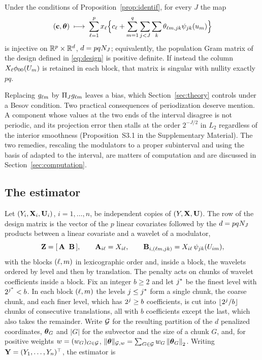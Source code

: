 \begin{lemma}
\label{lem:basis}
Under the conditions of Proposition~\ref{prop:identif}, for every $J$ the map
\[
  (\mathbf{c}, \boldsymbol{\theta}) \;\longmapsto\;
  \sum_{\ell=1}^{p} x_{\ell}\Bigl\{c_{\ell} + \sum_{m=1}^{q}
  \sum_{j<J}\sum_{k} \theta_{\ell m,jk}
  \psi_{jk}(u_{m})\Bigr\}
\]
is injective on $\mathbb{R}^{p}\times\mathbb{R}^{d}$, $d = pqN_{J}$; equivalently, the
population Gram matrix of the design defined in \eqref{eq:design} is positive
definite. If instead the column $X_{\ell}\phi_{00}(U_{m})$ is retained in
each block, that matrix is singular with nullity exactly $pq$.
\end{lemma}

Replacing $g_{\ell m}$ by $\Pi_{J}g_{\ell m}$ leaves a bias, which
Section~\ref{sec:theory} controls under a Besov condition. Two practical
consequences of periodization deserve mention. A component whose values at the
two ends of the interval disagree is not periodic, and its projection error
then stalls at the order $2^{-J/2}$ in $L_2$ regardless of the interior
smoothness (Proposition~S3.1 in the Supplementary Material). The two remedies,
rescaling the modulators to a proper subinterval and using the basis of
\citet*{cohen1993wavelets} adapted to the interval, are matters of computation
and are discussed in Section~\ref{sec:computation}.

\subsection{The estimator}
\label{sec:estimator}

Let $(Y_i,\mathbf{X}_i,\mathbf{U}_i)$, $i = 1,\dots,n$, be independent copies of
$(Y,\mathbf{X},\mathbf{U})$. The row of the design matrix is the vector of the $p$ linear
covariates followed by the $d = pqN_{J}$ products between a linear covariate and
a wavelet of a modulator,
\begin{equation}
  \label{eq:design}
  \mathbf{Z} = [\,\mathbf{A} \;\; \mathbf{B}\,], \qquad
  \mathbf{A}_{i\ell} = X_{i\ell}, \qquad
  \mathbf{B}_{i,(\ell m,jk)} = X_{i\ell}\,\psi_{jk}(U_{im}),
\end{equation}
with the blocks $(\ell,m)$ in lexicographic order and, inside a block, the
wavelets ordered by level and then by translation. The penalty
acts on chunks of wavelet coefficients inside a block. Fix an integer
$b \ge 2$ and let $j^{*}$ be the finest level with $2^{j^{*}} < b$. In each block
$(\ell,m)$ the levels $j \le j^{*}$ form a single chunk, the coarse chunk,
and each finer level, which has $2^{j} \ge b$ coefficients, is cut into
$\lfloor 2^{j}/b\rfloor$ chunks of consecutive translations, all with $b$
coefficients except the last, which also takes the remainder. Write $\mathcal{G}$ for
the resulting partition of the $d$ penalized coordinates, $\boldsymbol{\theta}_{G}$ and
$|G|$ for the subvector and the size of a chunk $G$, and, for positive weights
$w = (w_{G})_{G\in\mathcal{G}}$, $\lVert \boldsymbol{\theta}\rVert_{\mathcal{G},w} = \sum_{G\in\mathcal{G}}w_{G}\left\lVert \boldsymbol{\theta}_{G} \right\rVert_{2}$.
Writing
$\mathbf{Y} = (Y_1,\dots,Y_n)^{\top}$, the estimator is


